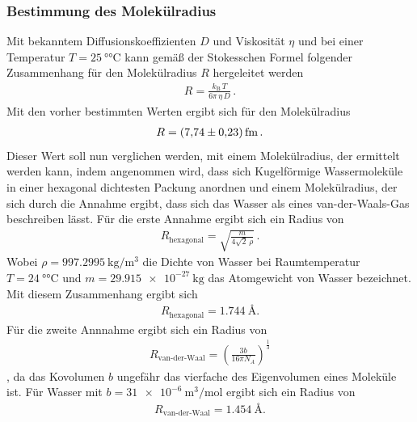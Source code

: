 \FloatBarrier
\subsubsection{Bestimmung des Molekülradius}
\label{subsubsec:molekuelradius}
Mit bekanntem Diffusionskoeffizienten $D$ und Viskosität $\eta$
und bei einer Temperatur $T=\SI{25}{\degree\celsius}$
kann gemäß
der Stokesschen Formel folgender Zusammenhang für den Molekülradius $R$ hergeleitet werden
\begin{align}
  \label{eqn:stokes}
  R = \frac{k_\text{B} \, T}{6 \pi \, \eta \, D} \, .
\end{align}
Mit den vorher bestimmten Werten ergibt sich für den Molekülradius
\begin{align*}
  R = \SI{7.74+-0.23}{\femto\meter} \, .
\end{align*}
Dieser Wert soll nun verglichen werden, mit einem Molekülradius, der ermittelt werden kann,
indem angenommen wird, dass sich
Kugelförmige Wassermoleküle in einer hexagonal dichtesten Packung anordnen
und einem Molekülradius, der sich durch die Annahme ergibt, dass sich das Wasser als eines van-der-Waals-Gas
beschreiben lässt.
Für die erste Annahme ergibt sich ein Radius von
\begin{align*}
  R_{\text{hexagonal}} = \sqrt{\frac{m}{4\sqrt{2} \, \rho}} \, .
\end{align*}
Wobei $\rho=\SI{997.2995}{\kilo\gram\per\meter\tothe{3}}$  \cite{litdicht} die Dichte von Wasser bei Raumtemperatur $T=\SI{24}{\degree\celsius}$
und $m=\SI{29.915e-27}{\kilo\gram}$ \cite{litatomgewicht} das Atomgewicht von Wasser bezeichnet.
Mit diesem Zusammenhang ergibt sich
\begin{align*}
  R_{\text{hexagonal}} = \SI{1.744}{\angstrom}.
\end{align*}
Für die zweite Annnahme ergibt sich ein Radius von
\begin{align}
R_{\text{van-der-Waal}}= \left(\frac{3b}{16\pi N_A}\right)^{\frac{1}{3}}
\end{align}
, da das Kovolumen $b$ ungefähr das
vierfache des Eigenvolumen eines Moleküle ist.
Für Wasser mit $b=\SI{31e-6}{\meter\tothe{3}\per\mol}$ \cite{litwaal} ergibt sich ein Radius von
\begin{align}
R_{\text{van-der-Waal}}= \SI{1.454}{\angstrom}.
\end{align}

